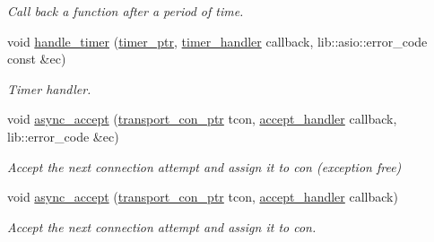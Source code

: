 \begin{DoxyCompactItemize}
\begin{DoxyCompactList}\small\item\em Call back a function after a period of time. \end{DoxyCompactList}\item 
void \mbox{\hyperlink{classwebsocketpp_1_1transport_1_1asio_1_1endpoint_a5345d9bbde4333d7b4b4858a4816e596}{handle\+\_\+timer}} (\mbox{\hyperlink{classwebsocketpp_1_1transport_1_1asio_1_1endpoint_a1802f5762009dbed117ff793fa87468f}{timer\+\_\+ptr}}, \mbox{\hyperlink{namespacewebsocketpp_1_1transport_a946cc56ff41139f3002149c15fd87bc9}{timer\+\_\+handler}} callback, lib\+::asio\+::error\+\_\+code const \&ec)
\begin{DoxyCompactList}\small\item\em Timer handler. \end{DoxyCompactList}\item 
void \mbox{\hyperlink{classwebsocketpp_1_1transport_1_1asio_1_1endpoint_ae24b2ea11e8ce90b6101c1ab56d7fe48}{async\+\_\+accept}} (\mbox{\hyperlink{classwebsocketpp_1_1transport_1_1asio_1_1endpoint_ac5fc306f32d15f92dd1b22366eaba62d}{transport\+\_\+con\+\_\+ptr}} tcon, \mbox{\hyperlink{namespacewebsocketpp_1_1transport_a9326ea831379368ee47841b2e46cb009}{accept\+\_\+handler}} callback, lib\+::error\+\_\+code \&ec)
\begin{DoxyCompactList}\small\item\em Accept the next connection attempt and assign it to con (exception free) \end{DoxyCompactList}\item 
void \mbox{\hyperlink{classwebsocketpp_1_1transport_1_1asio_1_1endpoint_a7e559e38bf344d60706f106db8b15d50}{async\+\_\+accept}} (\mbox{\hyperlink{classwebsocketpp_1_1transport_1_1asio_1_1endpoint_ac5fc306f32d15f92dd1b22366eaba62d}{transport\+\_\+con\+\_\+ptr}} tcon, \mbox{\hyperlink{namespacewebsocketpp_1_1transport_a9326ea831379368ee47841b2e46cb009}{accept\+\_\+handler}} callback)
\begin{DoxyCompactList}\small\item\em Accept the next connection attempt and assign it to con. \end{DoxyCompactList}\end{DoxyCompactItemize}
